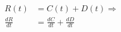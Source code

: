 \documentclass[preview]{standalone}
\begin{document}
\begin{math}
\begin{aligned}
    R(t) &= C(t) + D(t) \Rightarrow \\
    \frac{dR}{dt} &= \frac{dC}{dt} +  \frac{dD}{dt}
\end{aligned}
\end{math}

\end{document}
